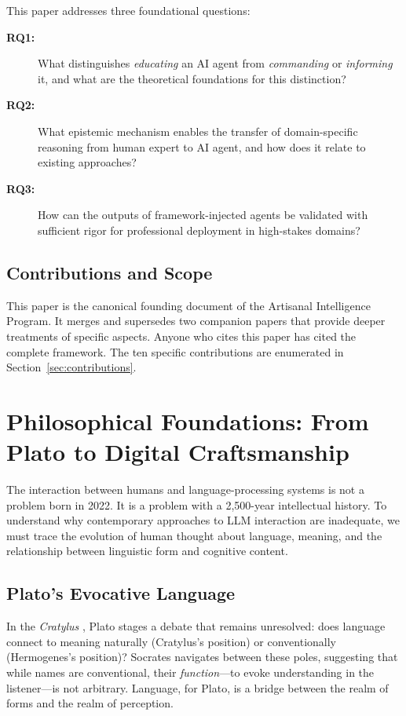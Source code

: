\documentclass[12pt,a4paper]{article}
\begin{document}
This paper addresses three foundational questions:

\begin{description}
  \item[\textbf{RQ1:}] What distinguishes \emph{educating} an AI agent from \emph{commanding} or \emph{informing} it, and what are the theoretical foundations for this distinction?
  \item[\textbf{RQ2:}] What epistemic mechanism enables the transfer of domain-specific reasoning from human expert to AI agent, and how does it relate to existing approaches?
  \item[\textbf{RQ3:}] How can the outputs of framework-injected agents be validated with sufficient rigor for professional deployment in high-stakes domains?
\end{description}

\subsection{Contributions and Scope}

This paper is the canonical founding document of the Artisanal Intelligence Program. It merges and supersedes two companion papers that provide deeper treatments of specific aspects. Anyone who cites this paper has cited the complete framework. The ten specific contributions are enumerated in Section~\ref{sec:contributions}.


\section{Philosophical Foundations: From Plato to Digital Craftsmanship}
\label{sec:philosophy}

The interaction between humans and language-processing systems is not a problem born in 2022. It is a problem with a 2,500-year intellectual history. To understand why contemporary approaches to LLM interaction are inadequate, we must trace the evolution of human thought about language, meaning, and the relationship between linguistic form and cognitive content.

\subsection{Plato's Evocative Language}

In the \emph{Cratylus} \cite{plato_cratylus}, Plato stages a debate that remains unresolved: does language connect to meaning naturally (Cratylus's position) or conventionally (Hermogenes's position)? Socrates navigates between these poles, suggesting that while names are conventional, their \emph{function}---to evoke understanding in the listener---is not arbitrary. Language, for Plato, is a bridge between the realm of forms and the realm of perception.
\end{document}

